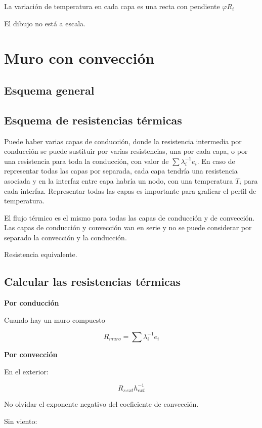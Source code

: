 \documentclass[11pt]{article}
\begin{document}
La variación de temperatura en cada capa es una recta con pendiente $ \varphi R_i $

El dibujo no está a escala.

\section{Muro con convección}

\subsection{Esquema general}

\subsection{Esquema de resistencias térmicas}

Puede haber varias capas de conducción, donde la resistencia intermedia por conducción se puede sustituir por varias resistencias, una por cada capa, o por una resistencia para toda la conducción, con valor de $ \sum{ \lambda ^{ -1 } _i } e_i $. En caso de representar todas las capas por separada, cada capa tendría una resistencia asociada y en la interfaz entre capa habría un nodo, con una temperatura $ T_i $ para cada interfaz. Representar todas las capas es importante para graficar el perfil de temperatura.

El flujo térmico es el mismo para todas las capas de conducción y de convección. Las capas de conducción y convección van en serie y no se puede considerar por separado la convección y la conducción.

Resistencia equivalente.

\subsection{Calcular las resistencias térmicas}

\textbf{Por conducción}

Cuando hay un muro compuesto

\[ R_{ muro } = \sum{ \lambda ^{ -1 } _i e_i } \]

\textbf{Por convección}

En el exterior:

\[ R_{ s \, ext } h_{ ext } ^{ -1 } \]

No olvidar el exponente negativo del coeficiente de convección.

Sin viento:
\end{document}
